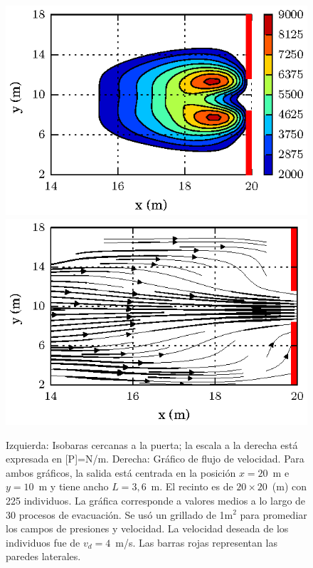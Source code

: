 \begin{figure}[H]
    \centering
    \includegraphics[scale=1]{figuras/press_225p_v4_onedoor_3_6.eps}
    \hfill
        \includegraphics[scale=1]{figuras/flujo_door_3_6m.eps}
    \caption[width=5cm]{Izquierda: Isobaras cercanas a la puerta; la escala a la derecha está expresada en [P]=N/m. Derecha: Gráfico de flujo de velocidad. Para ambos gráficos, la salida está centrada en la posición $x=20$~m e $y=10$~m y tiene ancho $L=3,6$~m. El recinto es de $20\times 20$~(m) con 225 individuos. La gráfica corresponde a valores medios a lo largo de 30 procesos de evacuación. Se usó un grillado de 1m$^2$ para promediar los campos de presiones y velocidad. La velocidad deseada de los individuos fue de $v_d=4$~m/s. Las barras rojas representan las paredes laterales.}
    \label{isobaras_flujo_3_6m}
\end{figure}

